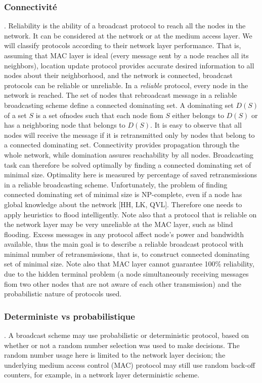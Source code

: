 \subsubsection{Connectivité}. Reliability is the ability of a broadcast protocol to reach all the nodes in the network. It can be considered at the network or at the medium access layer. We will classify protocols according to 
their network 
layer performance. That is, assuming that MAC layer is ideal (every message sent by a node reaches all its neighbors), location update protocol provides accurate desired information to all nodes about their neighborhood, and
 the network is connected, broadcast protocols can be reliable or unreliable. In a {\it reliable} protocol, every node in the network is reached. The set of nodes that rebroadcast message in a reliable broadcasting scheme 
define a connected dominating set. A dominating set $D(S)$ of a set $S$ is a set ofnodes such that each node fiom $S$ either belongs to $D(S)$ or has a neighboring node that belongs to $D(S)$. It is easy to observe that all
 nodes will receive the message if it is retransmitted only by nodes that belong to a connected dominating set. Connectivity provides propagation through the whole network, while domination assures reachability by all nodes.
 Broadcasting task can therefore be solved optimally by finding a connected dominating set of minimal size. Optimality here is measured by percentage of saved retransmissions in a reliable broadcasting scheme. Unfortunately,
 the problem of finding connected dominating set of minimal size is NP-complete, even if a node has global knowledge about the network [HH, LK, QVL]. Therefore one needs to apply heuristics to flood intelligently. Note also
 that a protocol that is reliable on the network layer may be very unreliable at the MAC layer, such as blind flooding. Excess messages in any protocol affect node's power and bandwidth available, thus the main goal is to
 describe a reliable broadcast protocol with minimal number of retransmissions, that is, to construct connected dominating set of minimal size. Note also that MAC layer cannot guarantee 100\% reliability, due to the hidden
 terminal problem (a node simultaneously receiving messages fiom two other nodes that are not aware of each other transmission) and the probabilistic nature of protocols used.

\subsubsection{Deterministe vs probabilistique}. A broadcast scheme may use probabilistic or deterministic protocol, based on whether or not a random number selection was used to make decisions. The random number usage here is
 limited to the network
 layer decision; the underlying medium access control (MAC) protocol may still use random back-off counters, for example, in a network layer deterministic scheme.



